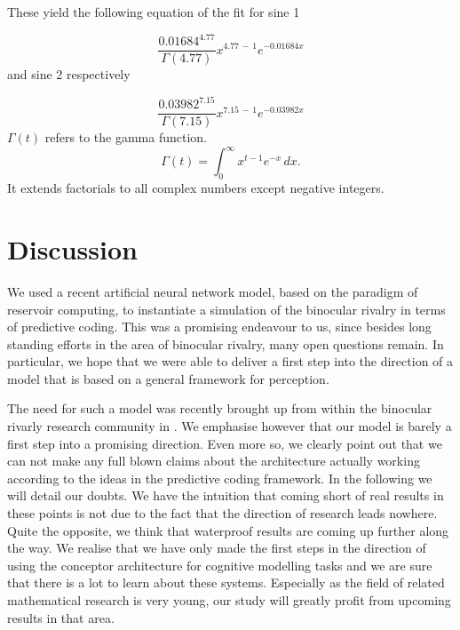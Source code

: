 \documentclass{frontiersSCNS} %
\begin{document}
    \vspace{1cm}
    These yield the following equation of the fit for sine 1
     
     \begin{equation}
		{\frac {0.01684 ^{4.77}}{\Gamma (4.77)}}x^{4.77 \,-\,1}e^{-0.01684 x}
     \end{equation}
     and sine 2 respectively
     
     \begin{equation}
		{\frac {0.03982 ^{7.15}}{\Gamma (7.15)}}x^{7.15 \,-\,1}e^{-0.03982 x}     
     \end{equation}
     $\Gamma (t)$ refers to the gamma function.
     \begin{equation}
      \Gamma (t)=\int _{0}^{\infty }x^{t-1}e^{-x}\,dx.
     \end{equation}
     It extends factorials to all complex numbers except negative integers.

\section{Discussion}

    We used a recent artificial neural network model, based on the paradigm of reservoir computing, to instantiate a simulation of the binocular rivalry in terms of predictive coding. This was a promising endeavour to us, since besides long standing efforts in the area of binocular rivalry, many open questions remain. In particular, we hope that we were able to deliver a first step into the direction of a model that is based on a general framework for perception.
    
    The need for such a model was recently brought up from within the binocular rivarly research community in \cite{Hohwy2008}. We emphasise however that our model is barely a first step into a promising direction. Even more so, we clearly point out that we can not make any full blown claims about the architecture actually working according to the ideas in the predictive coding framework. In the following we will detail our doubts. 
    We have the intuition that coming short of real results in these points is not due to the fact that the direction of research leads nowhere. Quite the opposite, we think that waterproof results are coming up further along the way. We realise that we have only made the first steps in the direction of using the conceptor architecture for cognitive modelling tasks and we are sure that there is a lot to learn about these systems. Especially as the field of related mathematical research is very young, our study will greatly profit from upcoming results in that area.
  
\end{document}
